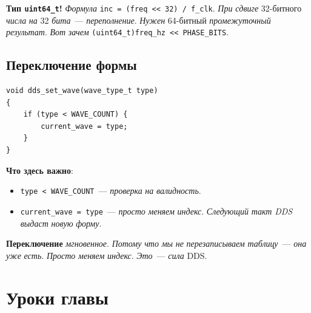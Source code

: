 \begin{warnbox}
\textbf{Тип \texttt{uint64\_t}!} \emph{Формула}
\texttt{inc = (freq << 32) / f\_clk}. \emph{При}
\emph{сдвиге} \num{32}-битного \emph{числа} \emph{на}
\num{32} \emph{бита}~--- \emph{переполнение}. \emph{Нужен}
\num{64}-битный \emph{промежуточный} \emph{результат}.
\emph{Вот} \emph{зачем} \texttt{(uint64\_t)freq\_hz << PHASE\_BITS}.
\end{warnbox}

\subsection{Переключение формы}

\begin{listing}[htbp]
\begin{verbatim}
void dds_set_wave(wave_type_t type)
{
    if (type < WAVE_COUNT) {
        current_wave = type;
    }
}
\end{verbatim}
\caption{\texttt{dds\_set\_wave()}~--- смена формы}
\label{lst:dds-set-wave}
\end{listing}

\textbf{Что здесь важно}:
\begin{itemize}
    \item \texttt{type < WAVE\_COUNT}~--- \emph{проверка}
          \emph{на} \emph{валидность}.
    \item \texttt{current\_wave = type}~--- \emph{просто}
          \emph{меняем} \emph{индекс}. \emph{Следующий}
          \emph{такт} \emph{DDS} \emph{выдаст} \emph{новую}
          \emph{форму}.
\end{itemize}

\begin{keybox}
\textbf{Переключение} \emph{мгновенное}. \emph{Потому}
\emph{что} \emph{мы} \emph{не} \emph{перезаписываем}
\emph{таблицу}~--- \emph{она} \emph{уже} \emph{есть}.
\emph{Просто} \emph{меняем} \emph{индекс}. \emph{Это}~---
\emph{сила} DDS.
\end{keybox}

\section{Уроки главы}
\label{sec:dds-lessons}

